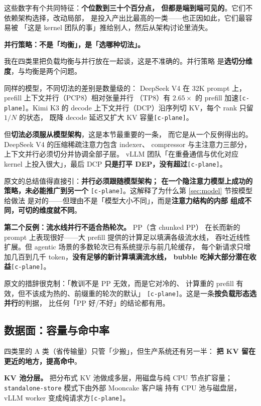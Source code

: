 \noindent 这些数字有个共同特征：\textbf{个位数到三十个百分点，
但都是端到端可见的}。它们不依赖架构选择，改动局部，
是投入产出比最高的一类——也正因如此，它们最容易被
「这是 kernel 团队的事」推给别人，然后从架构讨论里消失。

\noindent\textbf{并行策略：不是「均衡」，是「选哪种切法」。}

我在四类里把负载均衡与并行放在一起谈，这是不准确的。并行策略
是\textbf{选切分维度}，与均衡是两个问题。

\noindent 同样的模型，不同切法的差别是数量级的：
DeepSeek V4 在 32K prompt 上，prefill 上下文并行（PCP8）相对张量并行
（TP8）有 $2.65\times$ 的 prefill 加速\texttt{[c-plane]}。Kimi K3 的
decode 上下文并行（DCP）沿序列切 KV，每个 rank 只留 $1/N$ 的状态，
既降 decode 延迟又扩大 KV 容量\texttt{[c-plane]}。

\noindent 但\textbf{切法必须服从模型架构}，这是本节最重要的一条，
而它是从一个反例得出的。DeepSeek V4 的压缩稀疏注意力包含 indexer、
compressor 与主注意力三部分，上下文并行必须切分并协调全部子层。
vLLM 团队「在重叠通信与优化对应 kernel 上投入很大」，最后
DCP \textbf{只是打平 DEP，没有超过}\texttt{[c-plane]}。

\noindent 原文的总结值得直接引：\textbf{并行必须跟随模型架构；
在一个隐注意力模型上成功的策略，未必能推广到另一个}
\texttt{[c-plane]}。这解释了为什么第 \ref{sec:model} 节按模型给做法
是对的——但理由不是「模型大小不同」，而是\textbf{注意力结构的内部
组成不同，可切的维度就不同}。

\noindent\textbf{第二个反例：流水线并行不适合热轮次。} PP（含 chunked PP）
在长而新的 prompt 上表现很好——大 prefill 提供的计算足以填满各级流水线，
吞吐近线性扩展。但 agentic 场景的多数轮次已有系统提示与前几轮缓存，
每个新请求只增加几百到几千 token，\textbf{没有足够的新计算填满流水线，
bubble 吃掉大部分潜在收益}\texttt{[c-plane]}。

\noindent 原文的措辞很克制：「教训不是 PP 无效，而是它对冷的、
计算重的 prefill 有效，但不该成为热的、前缀重的轮次的默认」
\texttt{[c-plane]}。这是一条\textbf{按负载形态选并行}的判据，
比任何「PP 好/不好」的结论都有用。

\subsection{数据面：容量与命中率}

四类里的 A 类（省传输量）只管「少搬」，但生产系统还有另一半：
\textbf{把 KV 留在更近的地方，提高命中}。

\noindent\textbf{KV 池分层。} 把分布式 KV 池做成多层，用磁盘与纯 CPU
节点扩容量；\texttt{standalone-store} 模式下由外部 Mooncake 客户端
持有 CPU 池与磁盘层，vLLM worker 变成纯请求方\texttt{[c-plane]}。

